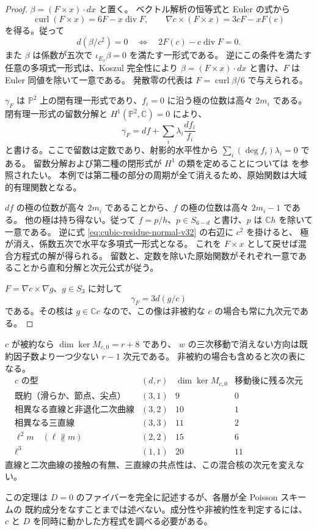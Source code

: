\begin{proof}
$\beta=(F\times x)\cdot dx$ と置く。
ベクトル解析の恒等式と Euler の式から
\[
 \operatorname{curl}(F\times x)=6F-x\operatorname{div}F,
 \qquad
 \nabla c\times(F\times x)=3cF-xF(c)
\]
を得る。従って
\[
 d(\beta/c^2)=0
 \quad\Longleftrightarrow\quad
 2F(c)-c\operatorname{div}F=0.
\]
また $\beta$ は係数が五次で $\iota_{E_x}\beta=0$ を満たす一形式である。
逆にこの条件を満たす任意の多項式一形式は、Koszul 完全性により $\beta=(F\times x)\cdot dx$
と書け、$F$ は Euler 同値を除いて一意である。
発散零の代表は $F=\operatorname{curl}\beta/6$ で与えられる。

$\gamma_F$ は $\mathbb P^2$ 上の閉有理一形式であり、$f_i=0$ に沿う極の位数は高々 $2m_i$ である。
閉有理一形式の留数分解と $H^1(\mathbb P^2,\mathbb C)=0$ により、
\[
 \gamma_F=df+\sum_i\lambda_i\frac{df_i}{f_i}
\]
と書ける。ここで留数は定数であり、射影的水平性から
$\sum_i(\deg f_i)\lambda_i=0$ である。
留数分解および第二種の閉形式が $H^1$ の類を定めることについては
\cite[\S5, Corollary~5.6]{PereiraClosedForms} を参照されたい。
本例では第二種の部分の周期が全て消えるため、原始関数は大域的有理関数となる。

$df$ の極の位数が高々 $2m_i$ であることから、$f$ の極の位数は高々 $2m_i-1$ である。
他の極は持ち得ない。従って $f=p/h$、$p\in S_{6-d}$ と書け、$p$ は $\mathbb Ch$ を除いて一意である。
逆に式 \eqref{eq:cubic-residue-normal-v32} の右辺に $c^2$ を掛けると、
極が消え、係数五次で水平な多項式一形式となる。
これを $F\times x$ として戻せば混合方程式の解が得られる。
留数と、定数を除いた原始関数がそれぞれ一意であることから直和分解と次元公式が従う。

$F=\nabla c\times\nabla g$、$g\in S_3$ に対して
\[
 \gamma_F=3d(g/c)
\]
である。その核は $g\in\mathbb Cc$ なので、この像は非被約な $c$ の場合も常に九次元である。
\end{proof}

\begin{corollary}[被約性と混合方向の増大]
$c$ が被約なら $\dim\ker M_{c,0}=r+8$ であり、
$w$ の三次移動で消えない方向は既約因子数より一つ少ない $r-1$ 次元である。
非被約の場合も含めると次の表になる。
\[
\begin{array}{l|c|c|c}
 c\text{ の型}&(d,r)&\dim\ker M_{c,0}&\text{移動後に残る次元}\\\hline
 \text{既約（滑らか、節点、尖点）}&(3,1)&9&0\\
 \text{相異なる直線と非退化二次曲線}&(3,2)&10&1\\
 \text{相異なる三直線}&(3,3)&11&2\\
 \ell^2m\quad(\ell\not\parallel m)&(2,2)&15&6\\
 \ell^3&(1,1)&20&11
\end{array}
\]
直線と二次曲線の接触の有無、三直線の共点性は、この混合核の次元を変えない。
\end{corollary}

この定理は $D=0$ のファイバーを完全に記述するが、各層が全 Poisson スキームの
既約成分をなすことまでは述べない。成分性や非被約性を判定するには、
$c$ と $D$ を同時に動かした方程式を調べる必要がある。
